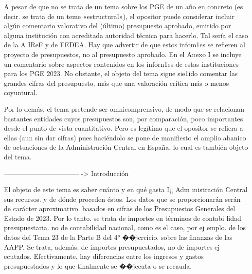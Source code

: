 \documentclass[10pt,a4paper]{article}
\begin{document}
A pesar de que no se trata de un tema sobre los PGE de un año en concreto (es decir. se trata de un teme «estructural»), el opositor puede considerar incluir algún comentario valorativo del (último) presupuesto aprobado, emitido por alguna institución con acreditada autoridad técnica para hacerlo. Tal sería el caso de la A IReF y de FEDEA. Hay que advertir de que estos infom1es se refieren al proyecto de presupuestos, no al presupuesto aprobado. En el Anexo I se incluye un comentario sobre aspectos contenidos en los inforn1es de estas instituciones para los PGE 2023. No obstante, el objeto del tema sigue sie1ído comentar las grandes cifras del presupuesto, más que una valoración crítica más o menos coyuntural.

Por lo demás, el tema pretende ser omnicomprensivo, de modo que se relacionan bastantes entidades cuyos presupuestos son, por comparación, poco importantes desde el punto de vista cuantitativo. Pero es legítimo que el opositor se refiera a ellas (aun sin dar cifras) pues haciéndolo se pone de manifiesto el amplio abanico de actuaciones de la Administración Central en España, lo cual es también objeto del tema.


--------------------------------- -> Introducción

El objeto de este tema es saber cuánto y en qué gasta I¡¡ Adm inistración Central sus recursos. y de dónde proceden éstos. Los datos que se proporcionarán serán de carácter aproximativo. basados en cifras de los Presupuestos Generales del Estado de 2023. Por lo tanto. se trata de importes en términos de contabi lidad presupuestaria. no de contabilidad nacional, como es el caso, por ej emplo. de los datos del Tema 23 de la Parte B del 4° ��jcrcicio. sobre las finanzas de las AAPP. Se trata, además. de importes presupuestados, no de importes ej ecutados. Efectivamente, hay diferencias entre los ingresos y gastos presupuestados y lo que tinalmente se ��jccuta o se recauda.
\end{document}
